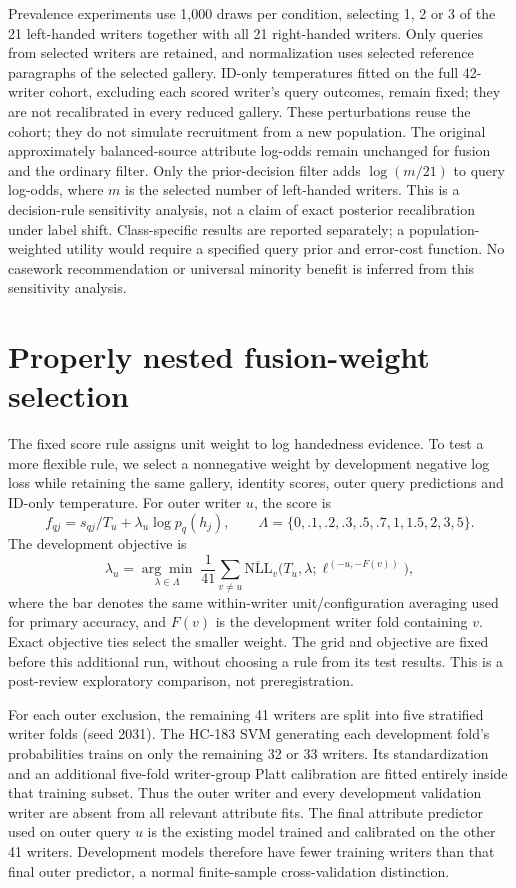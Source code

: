 \documentclass[10pt,a4paper]{article}
\begin{document}
Prevalence experiments use 1,000 draws per condition, selecting 1, 2 or 3 of the 21 left-handed writers together with all 21 right-handed writers. Only queries from selected writers are retained, and normalization uses selected reference paragraphs of the selected gallery. ID-only temperatures fitted on the full 42-writer cohort, excluding each scored writer's query outcomes, remain fixed; they are not recalibrated in every reduced gallery. These perturbations reuse the cohort; they do not simulate recruitment from a new population. The original approximately balanced-source attribute log-odds remain unchanged for fusion and the ordinary filter. Only the prior-decision filter adds $\log(m/21)$ to query log-odds, where $m$ is the selected number of left-handed writers. This is a decision-rule sensitivity analysis, not a claim of exact posterior recalibration under label shift. Class-specific results are reported separately; a population-weighted utility would require a specified query prior and error-cost function. No casework recommendation or universal minority benefit is inferred from this sensitivity analysis.

\section{Properly nested fusion-weight selection}
\label{sec:supnested}
The fixed score rule assigns unit weight to log handedness evidence. To test a more flexible rule, we select a nonnegative weight by development negative log loss while retaining the same gallery, identity scores, outer query predictions and ID-only temperature. For outer writer $u$, the score is
\[
 f_{qj}=s_{qj}/T_u+\lambda_u\log p_q(h_j),\qquad
 \Lambda=\{0,.1,.2,.3,.5,.7,1,1.5,2,3,5\}.
\]
The development objective is
\[
 \lambda_u=\underset{\lambda\in\Lambda}{\arg\min}\;
 \frac1{41}\sum_{v\ne u}\overline{\mathrm{NLL}}_v
 \big(T_u,\lambda;\ell^{(-u,-F(v))}\big),
\]
where the bar denotes the same within-writer unit/configuration averaging used for primary accuracy, and $F(v)$ is the development writer fold containing $v$. Exact objective ties select the smaller weight. The grid and objective are fixed before this additional run, without choosing a rule from its test results. This is a post-review exploratory comparison, not preregistration.

For each outer exclusion, the remaining 41 writers are split into five stratified writer folds (seed 2031). The HC-183 SVM generating each development fold's probabilities trains on only the remaining 32 or 33 writers. Its standardization and an additional five-fold writer-group Platt calibration are fitted entirely inside that training subset. Thus the outer writer and every development validation writer are absent from all relevant attribute fits. The final attribute predictor used on outer query $u$ is the existing model trained and calibrated on the other 41 writers. Development models therefore have fewer training writers than that final outer predictor, a normal finite-sample cross-validation distinction.
\end{document}
